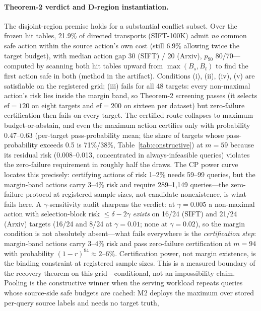 \documentclass{article}
\begin{document}
\paragraph{Theorem-2 verdict and D-region instantiation.}
The disjoint-region premise holds for a substantial conflict subset. Over the frozen hit tables, 21.9\%
of directed transports (SIFT-100K) admit \emph{no} common safe action within the source action's own
cost (still 6.9\% allowing twice the target budget), with median action gap 30 (SIFT) / 20 (Arxiv),
$p_{90}$ 80/70---computed by scanning both hit tables upward from $\max(B_s,B_t)$ to find the first
action safe in both (method in the artifact).
Conditions (i), (ii), (iv), (v) are satisfiable on the registered grid; (iii) fails for all 48 targets:
every non-maximal action's risk lies inside the margin band, so Theorem-2 screening passes (it selects
$\mathrm{ef}{=}120$ on eight targets and $\mathrm{ef}{=}200$ on sixteen per dataset) but zero-failure
certification then fails on every target. The certified route collapses to
maximum-budget-or-abstain, and even the maximum action certifies only with probability 0.47--0.63 (per-target pass-probability
mean; the share of targets whose pass-probability exceeds 0.5 is 71\%/38\%,
Table~\ref{tab:constructive}) at $m=59$ because its residual risk (0.008--0.013, concentrated in
always-infeasible queries) violates the zero-failure requirement in roughly half the draws. The CP power curve locates this precisely: certifying
actions of risk 1--2\% needs 59--99 queries, but the margin-band actions carry 3--4\% risk and require
289--1{,}149 queries---the zero-failure protocol at registered sample sizes, not candidate nonexistence,
is what fails here. A $\gamma$-sensitivity audit sharpens the verdict: at
$\gamma{=}0.005$ a non-maximal action with selection-block risk $\le\delta-2\gamma$ \emph{exists} on
16/24 (SIFT) and 21/24 (Arxiv) targets (16/24 and 8/24 at $\gamma{=}0.01$; none at $\gamma{=}0.02$), so
the margin condition is not absolutely absent---what fails everywhere is the \emph{certification step}:
margin-band actions carry 3--4\% risk and pass zero-failure certification at $m{=}94$ with probability
$(1-r)^{94}\approx2$--$6\%$. Certification power, not margin existence, is the binding constraint at
registered sample sizes. This is a measured boundary of the recovery theorem on this grid---conditional,
not an impossibility claim. Pooling is the constructive winner when the serving workload repeats queries whose source-side safe
budgets are cached: M2 deploys the maximum over stored per-query source labels and needs no target truth,
\end{document}
